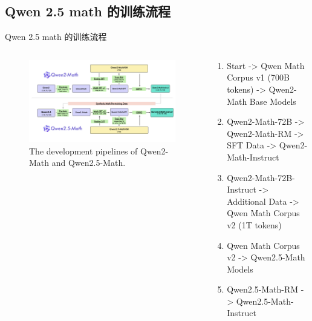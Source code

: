 \documentclass[aspectratio=169]{beamer}
\begin{document}
\subsection{Qwen 2.5 math 的训练流程}
\begin{frame}{Qwen 2.5 math 的训练流程}\small
	\begin{columns}
		\begin{column}{0.6\textwidth}
			\begin{figure}[htbp]
				\centering
				\includegraphics[width=1\columnwidth]{pic/qwen2.5-math-pipeline.jpeg}
				\vspace{-1mm}
				\caption{The development pipelines of Qwen2-Math and Qwen2.5-Math. }
				\label{fig:pipeline}
			\end{figure}
		\end{column}

		\begin{column}{0.4\textwidth}
			\begin{enumerate}
				\item Start -> Qwen Math Corpus v1 (700B tokens) -> Qwen2-Math Base Models
				\item Qwen2-Math-72B -> Qwen2-Math-RM -> SFT Data -> Qwen2-Math-Instruct
				\item Qwen2-Math-72B-Instruct -> Additional Data -> Qwen Math Corpus v2 (1T tokens)
				\item Qwen Math Corpus v2 -> Qwen2.5-Math Models
				\item Qwen2.5-Math-RM -> Qwen2.5-Math-Instruct
			\end{enumerate}
		\end{column}
	\end{columns}
\end{frame}
\end{document}
